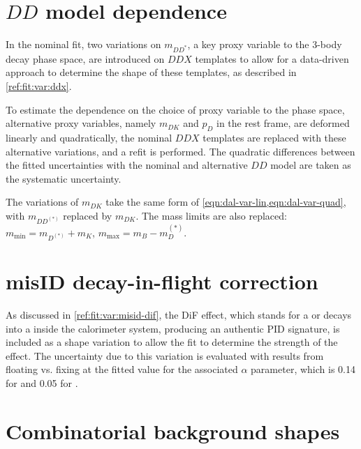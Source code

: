 

\section{$DD$ model dependence}
\label{sys-model-ddx}

In the nominal fit, two variations on $m_{DD^{*}}$,
a key proxy variable to the 3-body decay phase space,
are introduced on $DDX$ templates to allow for a data-driven approach to
determine the shape of these templates, as described in
\cref{ref:fit:var:ddx}.

To estimate the dependence on the choice of proxy variable to the phase space,
alternative proxy variables, namely $m_{DK}$ and $p_D$ in the \B rest frame,
are deformed linearly and quadratically,
the nominal $DDX$ templates are replaced with these alternative variations,
and a refit is performed.
The quadratic differences between the fitted uncertainties with the nominal and
alternative $DD$ model are taken as the systematic uncertainty.

The variations of $m_{DK}$ take the same form of
\cref{eqn:dal-var-lin,eqn:dal-var-quad}, with $m_{DD^{(*)}}$ replaced by
$m_{DK}$.
The mass limits are also replaced:
$m_\text{min} = m_{D^{(*)}} + m_K$, $m_\text{max} = m_B - m_D^{(*)}$.


\section{\muon misID decay-in-flight correction}
\label{sys-model-dif}

As discussed in \cref{ref:fit:var:misid-dif},
the DiF effect,
which stands for a \kaon or \pion decays into a \muon inside the calorimeter
system, producing an authentic \muon PID signature,
is included as a shape variation to allow the fit to determine
the strength of the effect.
The uncertainty due to this variation is evaluated with results
from floating vs. fixing at the fitted value for the associated $\alpha$
parameter,
which is 0.14 for \RD and 0.05 for \RDst.



\section{Combinatorial background shapes}
\label{sys-model-comb}

